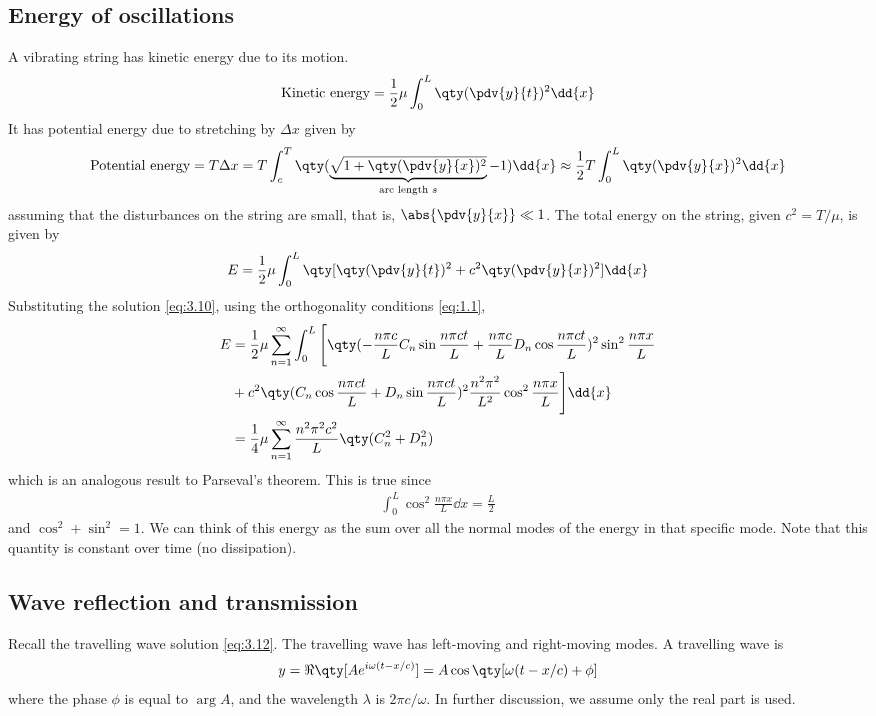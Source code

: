 \subsection{Energy of oscillations}
A vibrating string has kinetic energy due to its motion.
\begin{align*}
	\text{Kinetic energy} = \frac{1}{2} \mu \int_0^L \qty(\pdv{y}{t})^2 \dd{x}
\end{align*}
It has potential energy  due to stretching by $\Delta x$ given by
\begin{align*}
	\text{Potential energy} = T \Delta x = T \int_c^T \qty(\underbrace{\sqrt{1 + \qty(\pdv{y}{x})^2}}_\text{arc length $s$} -1)\dd{x} \approx \frac{1}{2} T \int_0^L \qty(\pdv{y}{x})^2 \dd{x}
\end{align*}
assuming that the disturbances on the string are small, that is, $\abs{\pdv{y}{x}} \ll 1$.
The total energy on the string, given $c^2 = T/\mu$, is given by
\begin{align} \label{eq:3.13}
	E = \frac{1}{2}\mu \int_0^L \qty[\qty(\pdv{y}{t})^2 + c^2 \qty(\pdv{y}{x})^2] \dd{x}
\end{align}
Substituting the solution \cref{eq:3.10}, using the orthogonality conditions \cref{eq:1.1},
\begin{align}
	E &= \frac{1}{2}\mu \sum_{n=1}^\infty \int_0^L \Bigg[\qty(-\frac{n \pi c}{L} C_n \sin \frac{n \pi c t}{L} + \frac{n \pi c}{L} D_n \cos \frac{n \pi c t}{L})^2 \sin^2 \frac{n \pi x}{L}\notag \\
	&+ c^2 \qty(C_n \cos \frac{n \pi c t}{L} + D_n \sin \frac{n \pi c t}{L})^2 \frac{n^2 \pi^2}{L^2} \cos^2 \frac{n \pi x}{L} \Bigg] \dd{x} \notag \\
	&= \frac{1}{4} \mu \sum_{n=1}^\infty \frac{n^2 \pi^2 c^2}{L} \qty(C_n^2 + D_n^2) \label{eq:3.14}
\end{align}
which is an analogous result to Parseval's theorem.
This is true since \begin{align*}
	\int_0^L \cos^2 \frac{n \pi x}{L}\dd{x} = \frac{L}{2}
\end{align*} and $\cos^2 + \sin^2 = 1$.
We can think of this energy as the sum over all the normal modes of the energy in that specific mode.
Note that this quantity is constant over time (no dissipation).

\subsection{Wave reflection and transmission}
Recall the travelling wave solution \cref{eq:3.12}.
The travelling wave has left-moving and right-moving modes.
A  travelling wave is
\begin{align*}
	y = \Re\qty[ A e^{i \omega(t-x/c)} ] = A \cos \qty[\omega(t-x/c) + \phi]
\end{align*}
where the phase $\phi$ is equal to $\arg A$, and the wavelength $\lambda$ is $2 \pi c / \omega$.
In further discussion, we assume only the real part is used.


